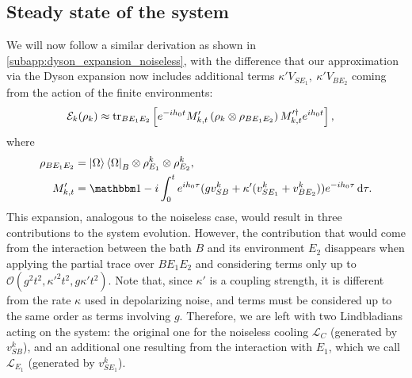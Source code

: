 \subsection{Steady state of the system}
We will now follow a similar derivation as shown in \cref{subapp:dyson_expansion_noiseless}, with the difference that our approximation via the Dyson expansion now includes additional terms $\kappa' V_{SE_1},\ \kappa' V_{BE_2}$ coming from the action of the finite environments:
\begin{align}
    \mathcal{E}_k(\rho_k) &\approx \operatorname{tr}_{BE_1E_2} \left[ e^{-i h_0 t} M_{k,t}' \left( \rho_k \otimes \rho_{BE_1E_2} \right) M_{k,t}'^\dag e^{i h_0 t} \right],\label{eq:expanded_map_finite_noise}
\end{align}
where
\begin{align}    \rho_{BE_1E_2} &=\ket{\Omega}\bra{\Omega}_B\otimes\rho_{E_{1}}^k\otimes\rho_{E_{2}}^k,\\
                 M_{k,t}'       &=\Id-i\int_0^t e^{i h_0 \tau}(gv_{SB}^k+\kappa' (v_{SE_1}^k+v_{BE_2}^k))e^{-i h_0 \tau}\dd \tau.
\end{align}
This expansion, analogous to the noiseless case, would result in three contributions to the system evolution. However, the contribution that would come from the interaction between the bath $B$ and its environment $E_2$ disappears when applying the partial trace over $BE_1E_2$ and considering terms only up to $\mathcal{O}(g^2t^2,\kappa'^2t^2,g\kappa' t^2)$. Note that, since $\kappa'$ is a coupling strength, it is different from the rate $\kappa$ used in depolarizing noise, and terms must be considered up to the same order as terms involving $g$. Therefore, we are left with two Lindbladians acting on the system: the original one for the noiseless cooling $\mathcal{L}_C$ (generated by $v_{SB}^k$), and an additional one resulting from the interaction with $E_1$, which we call $\mathcal{L}_{E_1}$ (generated by $v_{SE_1}^k$).


